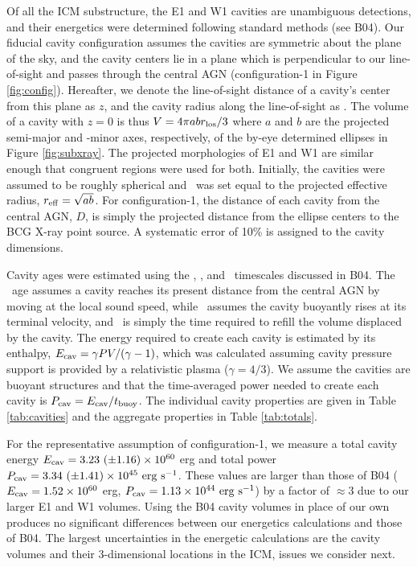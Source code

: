 \documentclass[apjpt4]{aastex}
\begin{document}
Of all the ICM substructure, the E1 and W1 cavities are unambiguous
detections, and their energetics were determined following standard
methods (see B04). Our fiducial cavity configuration assumes the
cavities are symmetric about the plane of the sky, and the cavity
centers lie in a plane which is perpendicular to our line-of-sight and
passes through the central AGN (configuration-1 in Figure
\ref{fig:config}). Hereafter, we denote the line-of-sight distance of
a cavity's center from this plane as $z$, and the cavity radius along
the line-of-sight as \rlos. The volume of a cavity with $z = 0$ is
thus $V = 4\pi a b r_{\rm{los}}/3$ where $a$ and $b$ are the projected
semi-major and -minor axes, respectively, of the by-eye determined
ellipses in Figure \ref{fig:subxray}. The projected morphologies of E1
and W1 are similar enough that congruent regions were used for
both. Initially, the cavities were assumed to be roughly spherical and
\rlos\ was set equal to the projected effective radius, $r_{\rm{eff}} =
\sqrt{ab}$. For configuration-1, the distance of each cavity from the
central AGN, $D$, is simply the projected distance from the ellipse
centers to the BCG X-ray point source. A systematic error of 10\% is
assigned to the cavity dimensions.

Cavity ages were estimated using the \tsonic, \tbuoy, and
\trefill\ timescales discussed in B04. The \tsonic\ age assumes a
cavity reaches its present distance from the central AGN by moving at
the local sound speed, while \tbuoy\ assumes the cavity buoyantly
rises at its terminal velocity, and \trefill\ is simply the time
required to refill the volume displaced by the cavity. The energy
required to create each cavity is estimated by its enthalpy, $E_{\rm{cav}} =
\gamma PV/(\gamma-1)$, which was calculated assuming cavity pressure
support is provided by a relativistic plasma ($\gamma = 4/3$). We
assume the cavities are buoyant structures and that the time-averaged
power needed to create each cavity is $P_{\rm{cav}} = E_{\rm{cav}}/t_{\rm{buoy}}$. The
individual cavity properties are given in Table \ref{tab:cavities} and
the aggregate properties in Table \ref{tab:totals}.

For the representative assumption of configuration-1, we measure a
total cavity energy $E_{\rm{cav}} = 3.23 ~(\pm 1.16) \times 10^{60}$ erg and
total power $P_{\rm{cav}} = 3.34 ~(\pm 1.41) \times 10^{45} ~\rm{\mbox{\ensuremath{\rm{erg}}}~\ensuremath{\rm{\mbox{\ensuremath{\rm{s}}}^{-1}}}}$. These
values are larger than those of B04 ($E_{\rm{cav}} = 1.52 \times 10^{60}$
erg, $P_{\rm{cav}} = 1.13 \times 10^{44} ~\rm{\mbox{\ensuremath{\rm{erg}}}~\ensuremath{\rm{\mbox{\ensuremath{\rm{s}}}^{-1}}}}$) by a factor of $\approx 3$
due to our larger E1 and W1 volumes. Using the B04 cavity volumes in
place of our own produces no significant differences between our
energetics calculations and those of B04. The largest uncertainties in
the energetic calculations are the cavity volumes and their
3-dimensional locations in the ICM, issues we consider next.
\end{document}
